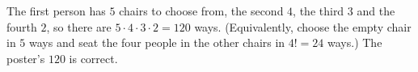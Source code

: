 The first person has $5$ chairs to choose from, the second $4$, the third $3$ and the fourth $2$, so there are $5\cdot4\cdot3\cdot2=\boxed{120}$ ways. (Equivalently, choose the empty chair in $5$ ways and seat the four people in the other chairs in $4!=24$ ways.) The poster's $120$ is correct.
